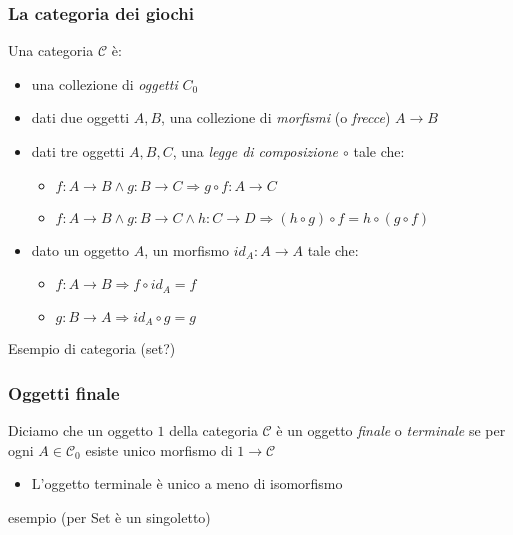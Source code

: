 \documentclass{beamer}
\begin{document}
\begin{frame}
	
	\frametitle{La categoria dei giochi}
	
	Una categoria $\mathcal{C}$ è:
	\begin{itemize}
		\item una collezione di \emph{oggetti} $C_0$
		\item dati due oggetti $A,B$, una collezione di \emph{morfismi} (o \emph{frecce}) $A \rightarrow B$
		\item dati tre oggetti $A,B,C$, una \emph{legge di composizione $\circ$} tale che:
		\begin{itemize}
			\item $f: A \rightarrow B \wedge g: B \rightarrow C \Rightarrow g\circ f : A \rightarrow C$
			\item $f: A \rightarrow B \wedge g: B \rightarrow C \wedge h: C \rightarrow D \Rightarrow (h\circ g) \circ f = h \circ (g \circ f)$
		\end{itemize}
		\item dato un oggetto $A$, un morfismo $id_A: A\rightarrow A$ tale che:
		\begin{itemize}
			\item $f: A \rightarrow B \Rightarrow f \circ id_A = f$
			\item $g: B \rightarrow A \Rightarrow id_A \circ g = g$
		\end{itemize}

	\end{itemize}
	
\end{frame}


\begin{frame}
	
	Esempio di categoria (set?)
	
\end{frame}


\begin{frame}

	\frametitle{Oggetti finale}
	
	Diciamo che un oggetto $1$ della categoria $\mathcal{C}$ è un oggetto \emph{finale} o \emph{terminale} se per ogni $A\in \mathcal{C}_0$ esiste unico morfismo di $1 \rightarrow \mathcal{C}$
	
	\begin{itemize}
		\item L'oggetto terminale è unico a meno di isomorfismo
	\end{itemize}
	
	esempio (per Set è un singoletto)

\end{frame}
\end{document}
